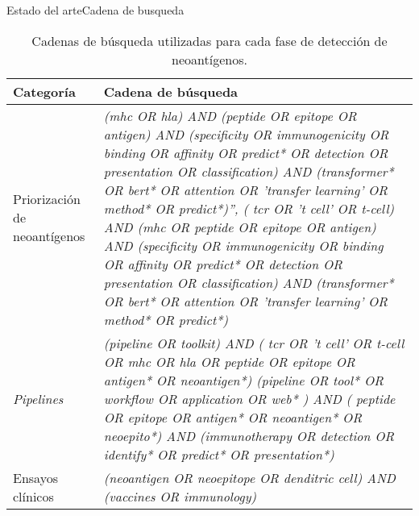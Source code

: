\documentclass[10pt]{beamer}
\newcommand{\1}{
	\setbeamertemplate{background}{
		\texttt{[image: img/1]}
		\tikz[overlay] \fill[fill opacity=0.75,fill=white] (0,0) rectangle (-\paperwidth,\paperheight);
	}
}
\begin{document}
\begin{frame}{Estado del arte}{Cadena de busqueda}
	
	\begin{table}[]
		\caption{Cadenas de búsqueda utilizadas para cada fase de detección de neoantígenos.}
		\label{tab:search}
		\centering
		\tiny
		\setlength{\tabcolsep}{0.5em} %
		{\renewcommand{\arraystretch}{1.7}%
			\begin{tabular}{p{3cm}p{7cm}}
				\textbf{Categoría} & \textbf{Cadena de búsqueda} \\ \hline
				Priorización de neoantígenos & \textit{(mhc OR hla) AND (peptide OR epitope OR antigen) AND (specificity OR immunogenicity OR binding OR affinity OR predict* OR detection OR presentation OR classification) AND (transformer* OR bert* OR attention OR 'transfer learning' OR method* OR predict*)'', ( tcr OR 't cell' OR t-cell) AND (mhc OR peptide OR epitope OR antigen) AND (specificity OR immunogenicity OR binding OR affinity OR predict* OR detection OR presentation OR classification) AND (transformer* OR bert* OR attention OR 'transfer learning' OR method* OR predict*)} \\
				
				
				\textit{Pipelines} & \textit{(pipeline OR toolkit) AND ( tcr OR 't cell' OR t-cell OR mhc OR hla OR peptide OR epitope OR antigen* OR neoantigen*) (pipeline OR tool* OR workflow OR application OR web* ) AND ( peptide OR epitope OR antigen* OR neoantigen* OR neoepito*) AND (immunotherapy OR detection OR identify* OR predict* OR presentation*)}\\
				
				Ensayos clínicos &  \textit{(neoantigen OR neoepitope OR denditric cell) AND (vaccines OR immunology)}
				
		\end{tabular}}
	\end{table}
\end{frame}
\end{document}
